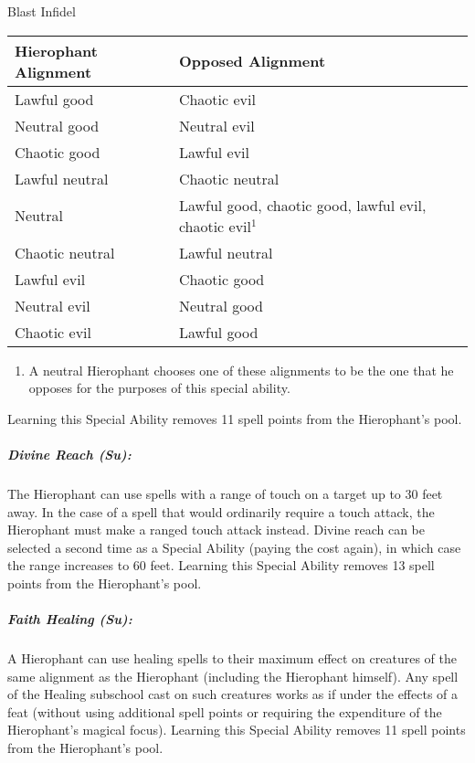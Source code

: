 \begin{tableonecolumn}
\caption{Blast Infidel}
\label{tab:BlastInfidel}
\begin{tabular}{p{2.4cm}p{4cm}}
\toprule
Hierophant Alignment&Opposed Alignment\\
\midrule
Lawful good&		Chaotic evil\\
Neutral good&		Neutral evil\\
Chaotic good&		Lawful evil\\
Lawful neutral&		Chaotic neutral\\
Neutral&		Lawful good, chaotic good, lawful evil, chaotic evil$^1$\\
Chaotic neutral&	Lawful neutral\\
Lawful evil&		Chaotic good\\
Neutral evil&		Neutral good\\
Chaotic evil&		Lawful good\\
\bottomrule
\end{tabular}
{\scriptsize
\begin{enumerate}
 \item A neutral Hierophant chooses one of these alignments to be the one that he opposes for the purposes of this special ability.
\end{enumerate}
}
\end{tableonecolumn}

Learning this Special Ability removes 11 spell points from the Hierophant's pool.

\subparagraph{Divine Reach (Su):}
The Hierophant can use spells with a range of touch on a target up to 30 feet away. 
In the case of a spell that would ordinarily require a touch attack, the Hierophant must make a ranged touch attack instead.
Divine reach can be selected a second time as a Special Ability (paying the cost again), in which case the range increases to 60 feet. 
Learning this Special Ability removes 13 spell points from the Hierophant's pool.

\subparagraph{Faith Healing (Su):}
A Hierophant can use healing spells to their maximum effect on creatures of the same alignment as the Hierophant (including the Hierophant himself). 
Any spell of the Healing subschool cast on such creatures works as if under the effects of a  feat (without using additional spell points or requiring the expenditure of the Hierophant's magical focus).
Learning this Special Ability removes 11 spell points from the Hierophant's pool.


